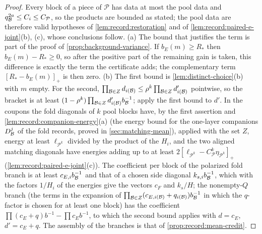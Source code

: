 \begin{proof}
Every block of a piece of $\mathcal P$ has data at most the pool data and
$q_\mathcal B^{2a}\le C_i\le C_{\mathcal P}$, so the products are bounded as stated;
the pool data are therefore valid hypotheses of \cref{lem:record:restoration}
and of \cref{lem:record:paired-e-joint}(b), (c), whose conclusions follow.
(a) The bound that justifies the term is part of the proof of
\cref{prop:background-variance}. If $b_E(m)\ge R_*$ then
$b_E(m)-R_*\ge0$, so after the positive part of the remaining
gain is taken, this difference is exactly the term the
certificate adds; the complementary term $[R_*-b_E(m)]_+$ is
then zero. (b) The first bound is
\cref{lem:distinct-choice}(b) with $m$ empty. For the second,
$\prod_{\mathcal B\in Z}d_{i(\mathcal B)}\le\rho^k\prod_{\mathcal B\in Z}d'_{i(\mathcal B)}$ pointwise, so the
bracket is at least $(1-\rho^k)\prod_{\mathcal B\in Z}d'_{i(\mathcal B)}b_\mathcal B^{-1}$; apply the
first bound to $d'$. In the coupons the fold diagonals of $k$ pool blocks have,
by the first assertion and \cref{lem:record:companion-energy}(a) (the energy bound for the
one-layer companions $D^j_\mathcal B$ of the fold records, proved in
\cref{sec:matching-mean}), applied with the set $Z$, energy at least
$\ell_{\mathcal P^k}$ divided by the product of the $H_i$, and the two aligned
matching diagonals have energies
adding up to at least $2[\ell_{\mathcal P^k}-C_{\mathcal P}^k\eta_{\mathcal P^k}]_+$
(\cref{lem:record:paired-e-joint}(c)). The coefficient per block of the polarized
fold branch is at least $c_{E,i}b_\mathcal B^{-1}$ and that of a chosen side diagonal
$k_{s,i}b_\mathcal B^{-1}$, which with the factors $1/H_i$ of the energies give the
vectors $c_F$ and $k_s/H$; the nonempty-$Q$ branch (the terms in the expansion of
$\prod_{\mathcal B\in Z}(c_{E,i(\mathcal B)}+q_{i(\mathcal B)})b_\mathcal B^{-1}$ in which the
$q$-factor is chosen for at least one block) has the coefficient
$\prod(c_E+q)b^{-1}-\prod c_Eb^{-1}$, to which the second bound applies with
$d=c_E$, $d'=c_E+q$. The assembly of the branches is that of
\cref{prop:record:mean-credit}.
\end{proof}

